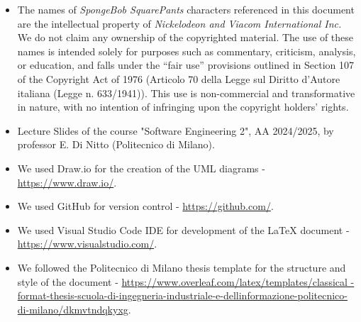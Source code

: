 \renewcommand{\thesection}{\Alph{section}}
\begin{itemize}
    \item The names of \textit{SpongeBob SquarePants} characters referenced in this document are the intellectual property of \textit{Nickelodeon and Viacom International Inc.}
    We do not claim any ownership of the copyrighted material. The use of these names is intended solely for purposes such as commentary, criticism, analysis, 
    or education, and falls under the ``fair use'' provisions outlined in Section 107 of the Copyright Act of 1976 (Articolo 70 della Legge sul Diritto d'Autore 
    italiana (Legge n. 633/1941)). This use is non-commercial and transformative in nature, with no intention of infringing upon the copyright holders' rights.
    
    \item Lecture Slides of the course "Software Engineering 2", AA 2024/2025, by professor E. Di Nitto (Politecnico di Milano).
    
    \item We used Draw.io for the creation of the UML diagrams - \url{https://www.draw.io/}.
    
    \item We used GitHub for version control - \url{https://github.com/}.
    
    \item We used Visual Studio Code IDE for development of the LaTeX document - \url{https://www.visualstudio.com/}.
    
    \item We followed the Politecnico di Milano thesis template for the structure and style of the document -
    \url{https://www.overleaf.com/latex/templates/classical
    -format-thesis-scuola-di-ingegneria-industriale-e-dellinformazione-politecnico-di-milano/dkmvtndqkyxg}.

\end{itemize}